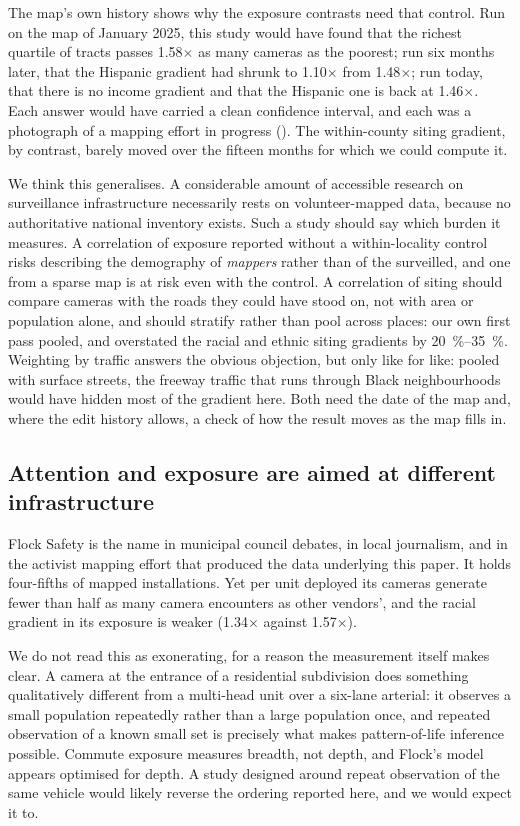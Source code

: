 \documentclass[11pt,twoside]{article}
\begin{document}
The map's own history shows why the exposure contrasts need that control. Run on the map of
January 2025, this study would have found that the richest quartile of tracts passes
\num{1.58}$\times$ as many cameras as the poorest; run six months later, that the Hispanic
gradient had shrunk to \num{1.10}$\times$ from \num{1.48}$\times$; run today, that there is
no income gradient and that the Hispanic one is back at \num{1.46}$\times$. Each answer would
have carried a clean confidence interval, and each was a photograph of a mapping effort in
progress (). The within-county siting gradient, by contrast, barely
moved over the fifteen months for which we could compute it.

We think this generalises. A considerable amount of accessible research on surveillance
infrastructure necessarily rests on volunteer-mapped data, because no authoritative national
inventory exists. Such a study should say which burden it measures. A correlation of exposure
reported without a within-locality control risks describing the demography of \emph{mappers}
rather than of the surveilled, and one from a sparse map is at risk even with the control. A
correlation of siting should compare cameras with the roads they could have stood on, not with
area or population alone, and should stratify rather than pool across places: our own first
pass pooled, and overstated the racial and ethnic siting gradients by \SIrange{20}{35}{\percent}. Weighting by
traffic answers the obvious objection, but only like for like: pooled with surface streets, the
freeway traffic that runs through Black neighbourhoods would have hidden most of the gradient
here. Both need the
date of the map and, where the edit history allows, a check of how the result moves as the map
fills in.

\subsection{Attention and exposure are aimed at different infrastructure}

Flock Safety is the name in municipal council debates, in local journalism, and in the
activist mapping effort that produced the data underlying this paper. It holds four-fifths
of mapped installations. Yet per unit deployed its cameras generate fewer than half as many
camera encounters as other vendors', and the racial gradient in its exposure is weaker
(\num{1.34}$\times$ against \num{1.57}$\times$).

We do not read this as exonerating, for a reason the measurement itself makes clear. A
camera at the entrance of a residential subdivision does something qualitatively different
from a multi-head unit over a six-lane arterial: it observes a small population repeatedly rather than a
large population once, and repeated observation of a known small set is precisely what
makes pattern-of-life inference possible. Commute exposure measures breadth, not depth, and
Flock's model appears optimised for depth. A study designed around repeat observation of
the same vehicle would likely reverse the ordering reported here, and we would expect it
to.
\end{document}
